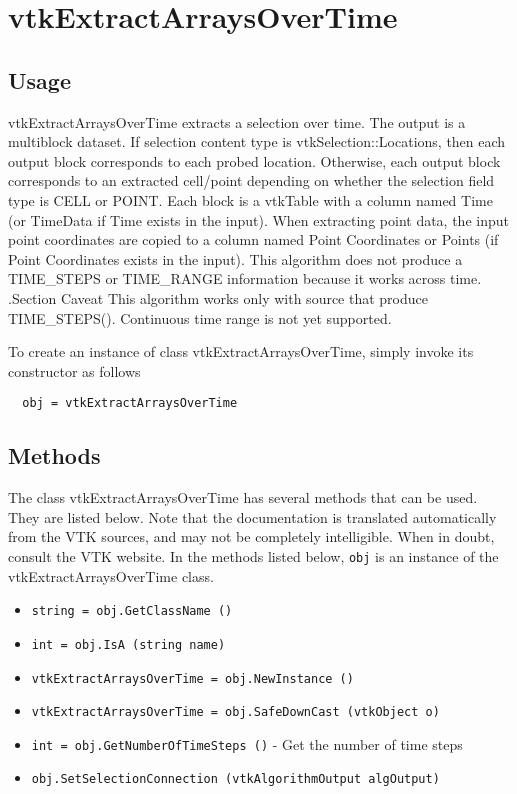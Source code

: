 \section{vtkExtractArraysOverTime}

\subsection{Usage}

 vtkExtractArraysOverTime extracts a selection over time.
 The output is a multiblock dataset. If selection content type is  
 vtkSelection::Locations, then each output block corresponds to each probed
 location. Otherwise, each output block corresponds to an extracted cell/point
 depending on whether the selection field type is CELL or POINT.
 Each block is a vtkTable with a column named Time (or TimeData if Time exists
 in the input).
 When extracting point data, the input point coordinates are copied
 to a column named Point Coordinates or Points (if Point Coordinates
 exists in the input).
 This algorithm does not produce a TIME\_STEPS or TIME\_RANGE information
 because it works across time. 
 .Section Caveat
 This algorithm works only with source that produce TIME\_STEPS().
 Continuous time range is not yet supported.

To create an instance of class vtkExtractArraysOverTime, simply
invoke its constructor as follows
\begin{verbatim}
  obj = vtkExtractArraysOverTime
\end{verbatim}
\subsection{Methods}

The class vtkExtractArraysOverTime has several methods that can be used.
  They are listed below.
Note that the documentation is translated automatically from the VTK sources,
and may not be completely intelligible.  When in doubt, consult the VTK website.
In the methods listed below, \verb|obj| is an instance of the vtkExtractArraysOverTime class.
\begin{itemize}
\item  \verb|string = obj.GetClassName ()|

\item  \verb|int = obj.IsA (string name)|

\item  \verb|vtkExtractArraysOverTime = obj.NewInstance ()|

\item  \verb|vtkExtractArraysOverTime = obj.SafeDownCast (vtkObject o)|

\item  \verb|int = obj.GetNumberOfTimeSteps ()| -  Get the number of time steps

\item  \verb|obj.SetSelectionConnection (vtkAlgorithmOutput algOutput)|

\end{itemize}
